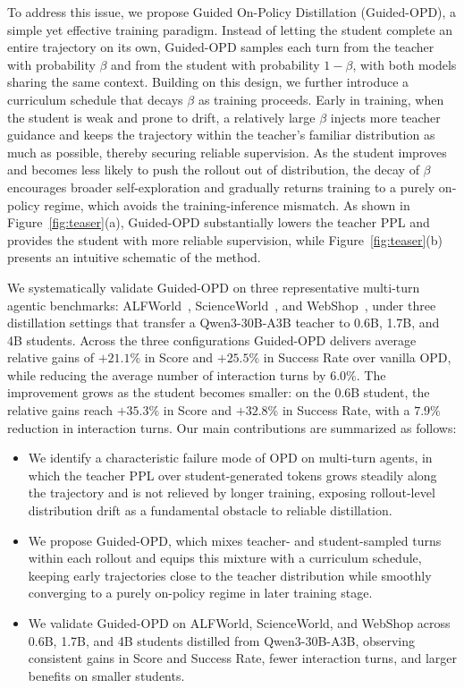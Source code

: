 \documentclass[11pt]{article}
\begin{document}
To address this issue, we propose Guided On-Policy Distillation (Guided-OPD), a simple yet effective training paradigm. Instead of letting the student complete an entire trajectory on its own, Guided-OPD samples each turn from the teacher with probability $\beta$ and from the student with probability $1-\beta$, with both models sharing the same context.
Building on this design, we further introduce a curriculum schedule that decays $\beta$ as training proceeds. Early in training, when the student is weak and prone to drift, a relatively large $\beta$ injects more teacher guidance and keeps the trajectory within the teacher's familiar distribution as much as possible, thereby securing reliable supervision. As the student improves and becomes less likely to push the rollout out of distribution, the decay of $\beta$ encourages broader self-exploration and gradually returns training to a purely on-policy regime, which avoids the training-inference mismatch.
As shown in Figure~\ref{fig:teaser}(a), Guided-OPD substantially lowers the teacher PPL and provides the student with more reliable supervision, while Figure~\ref{fig:teaser}(b) presents an intuitive schematic of the method.

We systematically validate Guided-OPD on three representative multi-turn agentic benchmarks: ALFWorld~\citep{ALFWorld}, ScienceWorld~\citep{ScienceWorld}, and WebShop~\citep{WebShop}, under three distillation settings that transfer a Qwen3-30B-A3B teacher to 0.6B, 1.7B, and 4B students. Across the three configurations Guided-OPD delivers average relative gains of $+21.1\%$ in Score and $+25.5\%$ in Success Rate over vanilla OPD, while reducing the average number of interaction turns by $6.0\%$. The improvement grows as the student becomes smaller: on the 0.6B student, the relative gains reach $+35.3\%$ in Score and $+32.8\%$ in Success Rate, with a $7.9\%$ reduction in interaction turns. 
Our main contributions are summarized as follows:
\begin{itemize}
    \item We identify a characteristic failure mode of OPD on multi-turn agents, in which the teacher PPL over student-generated tokens grows steadily along the trajectory and is not relieved by longer training, exposing rollout-level distribution drift as a fundamental obstacle to reliable distillation.
    \item We propose Guided-OPD, which mixes teacher- and student-sampled turns within each rollout and equips this mixture with a curriculum schedule, keeping early trajectories close to the teacher distribution while smoothly converging to a purely on-policy regime in later training stage.
    \item We validate Guided-OPD on ALFWorld, ScienceWorld, and WebShop across 0.6B, 1.7B, and 4B students distilled from Qwen3-30B-A3B, observing consistent gains in Score and Success Rate, fewer interaction turns, and larger benefits on smaller students. 
\end{itemize}
\end{document}
